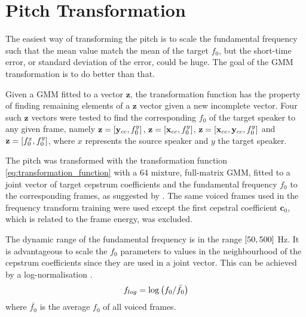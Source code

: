 
\section{Pitch Transformation} %
\label{sec:pitch_transformation}
The easiest way of transforming the pitch is to scale the fundamental frequency such that the mean value match the mean of the target $f_0$, but the short-time error, or standard deviation of the error, could be huge. The goal of the GMM transformation is to do better than that.

Given a GMM fitted to a vector $\mathbf{z}$, the transformation function has the property of finding remaining elements of a $\mathbf{z}$ vector given a new incomplete vector. Four such $\mathbf{z}$ vectors were tested to find the corresponding $f_0$ of the target speaker to any given frame, namely $\mathbf{z} = \left[\mathbf{y}_{cc},f_0^y\right]$, $\mathbf{z} = \left[\mathbf{x}_{cc},f_0^y\right]$, $\mathbf{z} = \left[\mathbf{x}_{cc},\mathbf{y}_{cc},f_0^y\right]$ and $\mathbf{z} = \left[f_0^x,f_0^y\right]$, where $x$ represents the source speaker and $y$ the target speaker.

The pitch was transformed with the transformation function \eqref{eq:transformation_function} with a 64 mixture, full-matrix GMM, fitted to a joint vector of target cepstrum coefficients and the fundamental frequency $f_0$ to the corresponding frames, as suggested by \cite{najjary03new}. The same voiced frames used in the frequency transform training were used except the first cepstral coefficient $\mathbf{c}_0$, which is related to the frame energy, was excluded. 

The dynamic range of the fundamental frequency is in the range $\left[50,500\right]$ Hz. It is advantageous to scale the $f_0$ parameters to values in the neighbourhood of the cepstrum coefficients since they are used in a joint vector. This can be achieved by a log-normalisation \cite{najjary03new}.
\begin{equation}
	f_{log} = \log \left(f_0/\bar{f_0}\right)
\end{equation}
where $\bar{f_0}$ is the average $f_0$ of all voiced frames.

